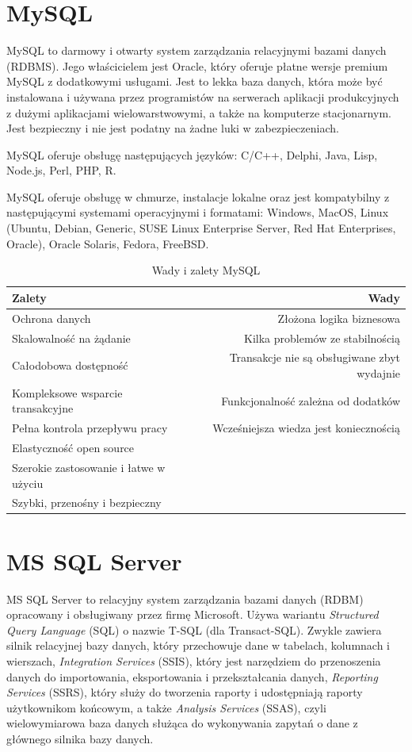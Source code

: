 \documentclass[oneside,polski,logo,indent]{amuthesis}
\begin{document}
\begin{enumerate}
\begin{enumerate}
\section{MySQL}
MySQL to darmowy i otwarty system zarządzania relacyjnymi bazami danych (RDBMS). Jego właścicielem jest Oracle, który oferuje płatne wersje premium MySQL z dodatkowymi usługami. Jest to lekka baza danych, która może być instalowana i używana przez programistów na serwerach aplikacji produkcyjnych z dużymi aplikacjami wielowarstwowymi, a także na komputerze stacjonarnym. Jest bezpieczny i nie jest podatny na żadne luki w zabezpieczeniach. 

\indent MySQL oferuje obsługę następujących języków: C/C++, Delphi, Java, Lisp, Node.js, Perl, PHP, R.


MySQL oferuje obsługę w chmurze, instalacje lokalne oraz jest kompatybilny z następującymi systemami operacyjnymi i formatami: Windows, MacOS, Linux (Ubuntu, Debian, Generic, SUSE Linux Enterprise Server, Red Hat Enterprises, Oracle), Oracle Solaris, Fedora, FreeBSD.

\begin{table}[H]
\caption{Wady i zalety MySQL}
\label{tabela-MySQL}
\centering
\begin{adjustbox}{width=1\textwidth}
\small
\begin{tabular}{lr}
\toprule
Zalety & Wady\\
\midrule
Ochrona danych & Złożona logika biznesowa\\
Skalowalność na żądanie & Kilka problemów ze stabilnością\\
Całodobowa dostępność & Transakcje nie są obsługiwane zbyt wydajnie\\
Kompleksowe wsparcie transakcyjne & Funkcjonalność zależna od dodatków\\
Pełna kontrola przepływu pracy & Wcześniejsza wiedza jest koniecznością\\
Elastyczność open source &\\
Szerokie zastosowanie i łatwe w użyciu &\\
Szybki, przenośny i bezpieczny &\\
\bottomrule
\end{tabular}
\end{adjustbox}
\end{table}
\section{MS SQL Server}
MS SQL Server to relacyjny system zarządzania bazami danych (RDBM) opracowany i obsługiwany przez firmę Microsoft. Używa wariantu \emph{Structured Query Language} (SQL) o nazwie T-SQL (dla Transact-SQL). Zwykle zawiera silnik relacyjnej bazy danych, który przechowuje dane w tabelach, kolumnach i wierszach,  \emph{Integration Services} (SSIS), który jest narzędziem do przenoszenia danych do importowania, eksportowania i przekształcania danych,  \emph{Reporting Services} (SSRS), który służy do tworzenia raporty i udostępniają raporty użytkownikom końcowym, a także  \emph{Analysis Services} (SSAS), czyli wielowymiarowa baza danych służąca do wykonywania zapytań o dane z głównego silnika bazy danych. 


\end{enumerate}
\end{enumerate}
\end{document}
